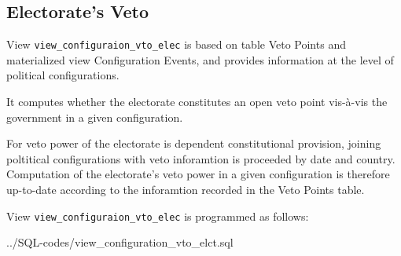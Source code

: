 \subsection{Electorate's Veto}\label{view_configuration_vto_elec}
View \texttt{\footnotesize view\_configuraion\_vto\_elec} is based on table Veto Points and materialized view Configuration Events, and provides information at the level of political configurations.

It computes whether the electorate constitutes an open veto point vis-\`a-vis the government in a given configuration.

For veto power of the electorate is dependent constitutional provision,
joining poltitical configurations with veto inforamtion is proceeded by date and country. 
Computation of the electorate's veto power in a given configuration is therefore up-to-date according to the inforamtion recorded in the Veto Points table.

View \texttt{\footnotesize view\_configuraion\_vto\_elec} is programmed as follows:

%
{../SQL-codes/view_configuration_vto_elct.sql}


